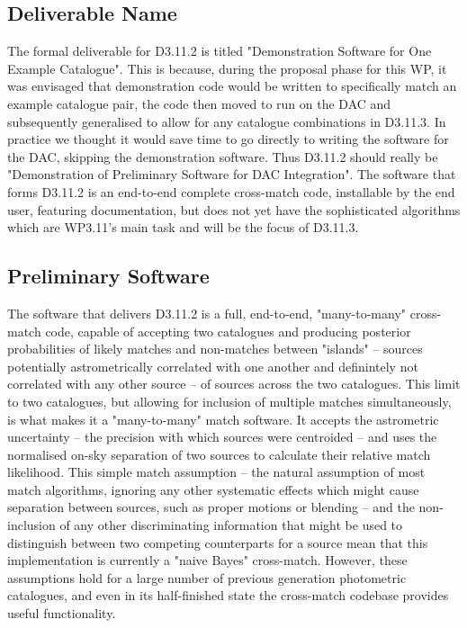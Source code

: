 \documentclass[a4paper,11pt]{scrartcl}
\begin{document}
\subsection{Deliverable Name}
The formal deliverable for D3.11.2 is titled "Demonstration Software for One Example Catalogue".
This is because, during the proposal phase for this WP, it was envisaged that demonstration code would be written to specifically match an example catalogue pair, the code then moved to run on the DAC and subsequently generalised to allow for any catalogue combinations in D3.11.3.
In practice we thought it would save time to go directly to writing the software for the DAC, skipping the demonstration software.
Thus D3.11.2 should really be "Demonstration of Preliminary Software for DAC Integration".
The software that forms D3.11.2 is an end-to-end complete cross-match code, installable by the end user, featuring documentation, but does not yet have the sophisticated algorithms which are WP3.11’s main task and will be the focus of D3.11.3.


\subsection{Preliminary Software}
The software that delivers D3.11.2 is a full, end-to-end, "many-to-many" cross-match code, capable of accepting two catalogues and producing posterior probabilities of likely matches and non-matches between "islands" -- sources potentially astrometrically correlated with one another and definintely not correlated with any other source -- of sources across the two catalogues.
This limit to two catalogues, but allowing for inclusion of multiple matches simultaneously, is what makes it a "many-to-many" match software.
It accepts the astrometric uncertainty -- the precision with which sources were centroided -- and uses the normalised on-sky separation of two sources to calculate their relative match likelihood.
This simple match assumption -- the natural assumption of most match algorithms, ignoring any other systematic effects which might cause separation between sources, such as proper motions or blending -- and the non-inclusion of any other discriminating information that might be used to distinguish between two competing counterparts for a source mean that this implementation is currently a "naive Bayes" cross-match.
However, these assumptions hold for a large number of previous generation photometric catalogues, and even in its half-finished state the cross-match codebase provides useful functionality.
\end{document}
